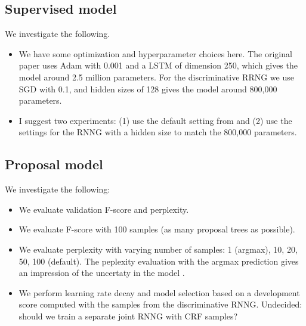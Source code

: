 \subsection{Supervised model} We investigate the following.
  \begin{itemize}
    \item We have some optimization and hyperparameter choices here. The original paper uses Adam with 0.001 and a LSTM of dimension 250, which gives the model around 2.5 million parameters. For the discriminative RRNG we use SGD with 0.1, and hidden sizes of 128 gives the model around 800,000 parameters.
    \item I suggest two experiments: (1) use the default setting from \citep{stern2017minimal} and (2) use the settings for the RNNG with a hidden size to match the 800,000 parameters.
  \end{itemize}

\subsection{Proposal model} We investigate the following:
  \begin{itemize}
    \item We evaluate validation F-score and perplexity.
    \item We evaluate F-score with 100 samples (as many proposal trees as possible).
    \item We evaluate perplexity with varying number of samples: 1 (argmax), 10, 20, 50, 100 (default). The peplexity evaluation with the argmax prediction gives an impression of the uncertaty in the model \citep{buys2018exact}.
    \item  We perform learning rate decay and model selection based on a development score computed with the samples from the discriminative RNNG. Undecided: should we train a separate joint RNNG with CRF samples?
  \end{itemize}

